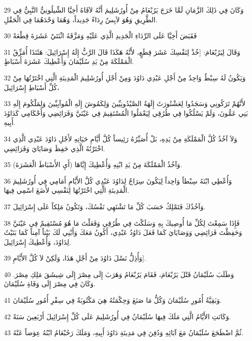 \par 29 وَكَانَ فِي ذَلِكَ الزَّمَانِ لَمَّا خَرَجَ يَرُبْعَامُ مِنْ أُورُشَلِيمَ أَنَّهُ لاَقَاهُ أَخِيَّا الشِّيلُونِيُّ النَّبِيُّ فِي الطَّرِيقِ وَهُوَ لاَبِسٌ رِدَاءً جَدِيداً، وَهُمَا وَحْدَهُمَا فِي الْحَقْلِ.
\par 30 فَقَبَضَ أَخِيَّا عَلَى الرِّدَاءِ الْجَدِيدِ الَّذِي عَلَيْهِ وَمَزَّقَهُ اثْنَتَيْ عَشَرَةَ قِطْعَةً
\par 31 وَقَالَ لِيَرُبْعَامَ: [خُذْ لِنَفْسِكَ عَشَرَ قِطَعٍ، لأَنَّهُ هَكَذَا قَالَ الرَّبُّ إِلَهُ إِسْرَائِيلَ: هَئَنَذَا أُمَزِّقُ الْمَمْلَكَةَ مِنْ يَدِ سُلَيْمَانَ وَأُعْطِيكَ عَشَرَةَ أَسْبَاطٍ.
\par 32 وَيَكُونُ لَهُ سِبْطٌ وَاحِدٌ مِنْ أَجْلِ عَبْدِي دَاوُدَ وَمِنْ أَجْلِ أُورُشَلِيمَ الْمَدِينَةِ الَّتِي اخْتَرْتُهَا مِنْ كُلِّ أَسْبَاطِ إِسْرَائِيلَ،
\par 33 لأَنَّهُمْ تَرَكُونِي وَسَجَدُوا لِعَشْتُورَثَ إِلَهَةُ الصَّيْدُونِيِّينَ وَلِكَمُوشَ إِلَهِ الْمُوآبِيِّينَ وَلِمَلْكُومَ إِلَهِ بَنِي عَمُّونَ، وَلَمْ يَسْلُكُوا فِي طُرُقِي لِيَعْمَلُوا الْمُسْتَقِيمَ فِي عَيْنَيَّ وَفَرَائِضِي وَأَحْكَامِي كَدَاوُدَ أَبِيهِ.
\par 34 وَلاَ آخُذُ كُلَّ الْمَمْلَكَةِ مِنْ يَدِهِ، بَلْ أُصَيِّرُهُ رَئِيساً كُلَّ أَيَّامِ حَيَاتِهِ لأَجْلِ دَاوُدَ عَبْدِي الَّذِي اخْتَرْتُهُ الَّذِي حَفِظَ وَصَايَايَ وَفَرَائِضِي.
\par 35 وَآخُذُ الْمَمْلَكَةَ مِنْ يَدِ ابْنِهِ وَأُعْطِيكَ إِيَّاهَا (أَيِ الأَسْبَاطَ الْعَشَرَةَ).
\par 36 وَأُعْطِي ابْنَهُ سِبْطاً وَاحِداً لِيَكُونَ سِرَاجٌ لِدَاوُدَ عَبْدِي كُلَّ الأَيَّامِ أَمَامِي فِي أُورُشَلِيمَ الْمَدِينَةِ الَّتِي اخْتَرْتُهَا لِنَفْسِي لأَضَعَ اسْمِي فِيهَا.
\par 37 وَآخُذُكَ فَتَمْلِكُ حَسَبَ كُلِّ مَا تَشْتَهِي نَفْسُكَ، وَتَكُونُ مَلِكاً عَلَى إِسْرَائِيلَ.
\par 38 فَإِذَا سَمِعْتَ لِكُلِّ مَا أُوصِيكَ بِهِ وَسَلَكْتَ فِي طُرُقِي وَفَعَلْتَ مَا هُوَ مُسْتَقِيمٌ فِي عَيْنَيَّ وَحَفِظْتَ فَرَائِضِي وَوَصَايَايَ كَمَا فَعَلَ دَاوُدُ عَبْدِي، أَكُونُ مَعَكَ وَأَبْنِي لَكَ بَيْتاً آمِناً كَمَا بَنَيْتُ لِدَاوُدَ، وَأُعْطِيكَ إِسْرَائِيلَ.
\par 39 وَأُذِلُّ نَسْلَ دَاوُدَ مِنْ أَجْلِ هَذَا، وَلَكِنْ لاَ كُلَّ الأَيَّامِ].
\par 40 وَطَلَبَ سُلَيْمَانُ قَتْلَ يَرُبْعَامَ، فَقَامَ يَرُبْعَامُ وَهَرَبَ إِلَى مِصْرَ إِلَى شِيشَقَ مَلِكِ مِصْرَ. وَكَانَ فِي مِصْرَ إِلَى وَفَاةِ سُلَيْمَانَ.
\par 41 وَبَقِيَّةُ أُمُورِ سُلَيْمَانَ وَكُلُّ مَا صَنَعَ وَحِكْمَتُهُ هِيَ مَكْتُوبَةٌ فِي سِفْرِ أُمُورِ سُلَيْمَانَ.
\par 42 وَكَانَتِ الأَيَّامُ الَّتِي مَلَكَ فِيهَا سُلَيْمَانُ فِي أُورُشَلِيمَ عَلَى كُلِّ إِسْرَائِيلَ أَرْبَعِينَ سَنَةً.
\par 43 ثُمَّ اضْطَجَعَ سُلَيْمَانُ مَعَ آبَائِهِ وَدُفِنَ فِي مَدِينَةِ دَاوُدَ أَبِيهِ، وَمَلَكَ رَحُبْعَامُ ابْنُهُ عِوَضاً عَنْهُ.

